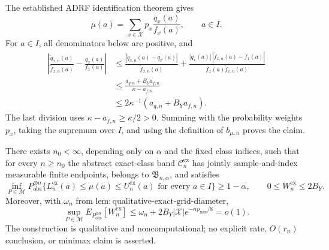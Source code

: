 The established ADRF identification theorem gives
\[
 \mu(a)=\sum_{x\in\mathcal X}p_x\frac{q_x(a)}{f_x(a)},
 \qquad a\in I.
\]
For \(a\in I\), all denominators below are positive, and
\[
 \begin{aligned}
 \left|\frac{\widetilde q_{x,n}(a)}{\widetilde f_{x,n}(a)}
       -\frac{q_x(a)}{f_x(a)}\right|
 &\le
 \frac{|\widetilde q_{x,n}(a)-q_x(a)|}{\widetilde f_{x,n}(a)}
 +\frac{|q_x(a)|\,|\widetilde f_{x,n}(a)-f_x(a)|}
 {f_x(a)\widetilde f_{x,n}(a)}\\
 &\le\frac{a_{q,n}+B_Ya_{f,n}}{\kappa-a_{f,n}}\\
 &\le2\kappa^{-1}(a_{q,n}+B_Ya_{f,n}).
 \end{aligned}
\]
The last division uses \(\kappa-a_{f,n}\ge\kappa/2>0\).  Summing with the probability weights \(p_x\), taking the supremum over \(I\), and using the definition of \(b_{\mu,n}\) proves the claim.

There exists \(n_0<\infty\), depending only on \(\alpha\) and the fixed class indices, such that for every \(n\ge n_0\) the abstract exact-class band \(\mathcal C_n^{\mathrm{ex}}\) has jointly sample-and-index measurable finite endpoints, belongs to \(\mathfrak B_{n,\alpha}\), and satisfies
\[
 \inf_{P\in\mathcal M}P_{\mathrm{obs}}^{\otimes n}
 \{L_n^{\mathrm{ex}}(a)\le\mu(a)\le U_n^{\mathrm{ex}}(a)
 \text{ for every }a\in I\}\ge1-\alpha,
 \qquad 0\le W_n^{\mathrm{ex}}\le2B_Y.
\]
Moreover, with \(\omega_n\) from \(\mathrm{lem{:}qualitative\text{-}exact\text{-}grid\text{-}diameter}\),
\[
 \sup_{P\in\mathcal M}
 E_{P_{\mathrm{obs}}^{\otimes n}}[W_n^{\mathrm{ex}}]
 \le \omega_n+2B_Y|\mathcal X|e^{-np_{\min}/8}=o(1).
\]
The construction is qualitative and noncomputational; no explicit rate, \(O(r_n)\) conclusion, or minimax claim is asserted.

